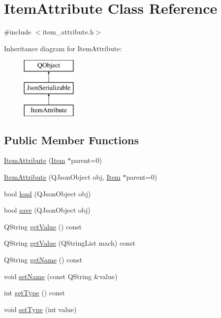 \hypertarget{class_item_attribute}{}\section{Item\+Attribute Class Reference}
\label{class_item_attribute}


{\ttfamily \#include $<$item\+\_\+attribute.\+h$>$}

Inheritance diagram for Item\+Attribute\+:\begin{figure}[H]
\begin{center}
\leavevmode
\includegraphics[height=3.000000cm]{class_item_attribute}
\end{center}
\end{figure}
\subsection*{Public Member Functions}
\begin{DoxyCompactItemize}
\item 
\hyperlink{class_item_attribute_a1245a8f1a5bd8e214a249bfadaf3a471}{Item\+Attribute} (\hyperlink{class_item}{Item} $\ast$parent=0)
\item 
\hyperlink{class_item_attribute_a934cfe58d341d8a8e0e956e9813ddf71}{Item\+Attribute} (Q\+Json\+Object obj, \hyperlink{class_item}{Item} $\ast$parent=0)
\item 
bool \hyperlink{class_item_attribute_a5504e3f5abf4e2f48eba7893fc6d297e}{load} (Q\+Json\+Object obj)
\item 
bool \hyperlink{class_item_attribute_a5622c9174b2b4e5c1d37b2e76d4ca2d9}{save} (Q\+Json\+Object obj)
\item 
Q\+String \hyperlink{class_item_attribute_aa9c05254cd2706c7afc051c2f159278f}{get\+Value} () const
\item 
Q\+String \hyperlink{class_item_attribute_a8c00d3838c2406b6ebe6515246399896}{get\+Value} (Q\+String\+List mach) const
\item 
Q\+String \hyperlink{class_item_attribute_a1e858380efb11bbbc7edd241059cee96}{get\+Name} () const
\item 
void \hyperlink{class_item_attribute_a2eac222eddafebcddad8aaa8e7926ffd}{set\+Name} (const Q\+String \&value)
\item 
int \hyperlink{class_item_attribute_a3eec36cbf8033331845d89de15754b83}{get\+Type} () const
\item 
void \hyperlink{class_item_attribute_a3c763039c2ba34ab53c5c8fa46b655d7}{set\+Type} (int value)
\end{DoxyCompactItemize}


